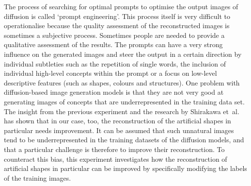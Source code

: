 The process of searching for optimal prompts to optimise the output images of diffusion is called `prompt engineering'\cite{witteveenInvestigatingPromptEngineering2022}. This process itself is very difficult to operationalise because the quality assessment of the reconstructed images is sometimes a subjective process. Sometimes people are needed to provide a qualitative assessment of the results\cite{pavlichenkoBestPromptsTexttoImage2023}. The prompts can have a very strong influence on the generated images and steer the output in a certain direction by individual subtleties such as the repetition of single words,  the inclusion of individual high-level concepts within the prompt or a focus on low-level descriptive features (such as shapes, colours and structures)\cite{witteveenInvestigatingPromptEngineering2022}. One problem with diffusion-based image generation models is that they are not very good at generating images of concepts that are underrepresented in the training data set\cite{samuelGeneratingImagesRare2024}. The insight from the previous experiment and the research by Shirakawa et\ al.\cite{shirakawaSpuriousReconstructionBrain2024} has shown that in our case, too, the reconstruction of the artificial shapes in particular needs improvement. It can be assumed that such unnatural images tend to be underrepresented in the training datasets of the diffusion models\cite{schuhmannLAION400MOpenDataset2021, schuhmannLAION5BOpenLargescale2022}, and that a particular challenge is therefore to improve their reconstruction. To counteract this bias, this experiment investigates how the reconstruction of artificial shapes in particular can be improved by specifically modifying the labels of the training images. 


